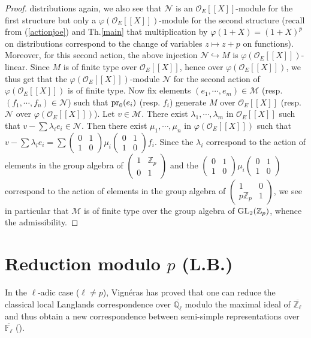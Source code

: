 \documentclass[11pt]{amsart}
\def\Z{{\mathbb Z}_p}
\def\K{{\rm GL}_2(\Z)}
\def\O{{\mathcal O}_E}
\begin{document}
\begin{proof}
	distributions again, we also see that ${\mathcal N}$ is an
	$\O[[X]]$-module for the first structure but only a
	$\varphi(\O[[X]])$-module for the second structure (recall
	from (\ref{actionjoe}) and Th.\ref{main} that multiplication
	by $\varphi(1+X)=(1+X)^p$ on distributions correspond to the
	change of variables $z\mapsto z+p$ on functions). Moreover,
	for this second action, the above injection ${\mathcal
	  N}\hookrightarrow M$ is $\varphi(\O[[X]])$-linear. Since $M$
	is of finite type over $\O[[X]]$, hence over
	$\varphi(\O[[X]])$, we thus get that the
	$\varphi(\O[[X]])$-module ${\mathcal N}$ for the second action
	of $\varphi(\O[[X]])$ is of finite type. Now fix elements
	$(e_1,\cdots,e_m)\in {\mathcal M}$ (resp. $(f_1,\cdots,f_n)\in
	{\mathcal N}$) such that ${\rm pr}_0(e_i)$ (resp. $f_i$)
	generate $M$ over $\O[[X]]$ (resp. $\mathcal N$ over
	$\varphi(\O[[X]])$). Let $v\in {\mathcal M}$. There exist
	$\lambda_1,\cdots,\lambda_m$ in $\O[[X]]$ such that $v-\sum
	\lambda_ie_i\in {\mathcal N}$. Then there exist
	$\mu_1,\cdots,\mu_n$ in $\varphi(\O[[X]])$ such that $v-\sum
	\lambda_ie_i=\sum
	\begin{pmatrix}0&1\\1&0\end{pmatrix}\mu_i\begin{pmatrix}0&1\\1&0\end{pmatrix}f_i$. 
Since the $\lambda_i$ correspond to the action of elements in the
group algebra of $\begin{pmatrix}1&\Z\\0&1\end{pmatrix}$ and the
  $\begin{pmatrix}0&1\\1&0\end{pmatrix}
\mu_i\begin{pmatrix}0&1\\1&0\end{pmatrix}$ 
correspond to the action of elements in the group algebra 
of $\begin{pmatrix}1&0\\p\Z&1\end{pmatrix}$, we see in 
particular that $\mathcal M$ is of finite type over the 
group algebra of $\K$, whence the admissibility.      
\end{proof} 
 
 
\section{Reduction modulo $p$ (L.B.)} 
In the $\ell$-adic case ($\ell\ne p$), Vign\'eras has proved that one
can reduce the classical local Langlands correspondence over
$\overline{{\mathbb Q}_{\ell}}$ modulo the maximal ideal of
$\overline{{\mathbb Z}_{\ell}}$ and thus obtain a new correspondence
between semi-simple representations over $\overline{{\mathbb
    F}_{\ell}}$ (\cite{Vi}).  
 
\end{document}
